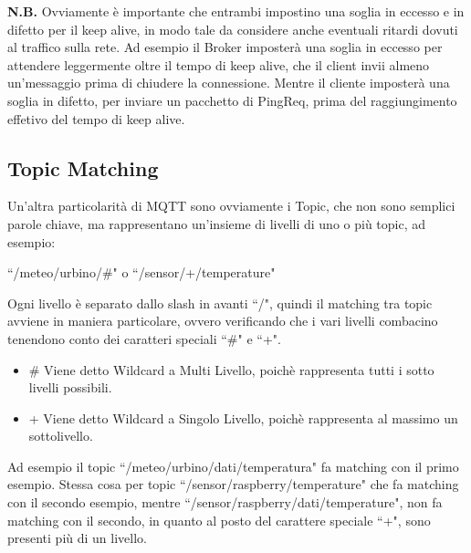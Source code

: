 \documentclass{article}
\begin{document}
\textbf{N.B.} Ovviamente è importante che entrambi impostino una soglia in eccesso e in difetto per il keep alive, in modo tale da considere anche eventuali ritardi dovuti al traffico sulla rete. Ad esempio il Broker imposterà una soglia in eccesso per attendere leggermente oltre il tempo di keep alive, che il client invii almeno un'messaggio prima di chiudere la connessione. Mentre il cliente imposterà una soglia in difetto, per inviare un pacchetto di PingReq, prima del raggiungimento effetivo del tempo di keep alive.

\subsection{Topic Matching}
Un'altra particolarità di MQTT sono ovviamente i Topic, che non sono semplici parole chiave, ma rappresentano un'insieme di livelli di uno o più topic, ad esempio:
\begin{center}
	``/meteo/urbino/\#" o ``/sensor/+/temperature"
\end{center}

Ogni livello è separato dallo slash in avanti ``/", quindi il matching tra topic avviene in maniera particolare, ovvero verificando che i vari livelli combacino tenendono conto dei caratteri speciali ``\#" e ``+".
\begin{itemize}
	\item \# Viene detto Wildcard a Multi Livello, poichè rappresenta tutti i sotto livelli possibili.
	\item + Viene detto Wildcard a Singolo Livello, poichè rappresenta al massimo un sottolivello.
\end{itemize}
Ad esempio il topic ``/meteo/urbino/dati/temperatura" fa matching con il primo esempio. Stessa cosa per topic ``/sensor/raspberry/temperature" che fa matching con il secondo esempio, mentre ``/sensor/raspberry/dati/temperature", non fa matching con il secondo, in quanto al posto del carattere speciale ``+", sono presenti più di un livello.
\end{document}
